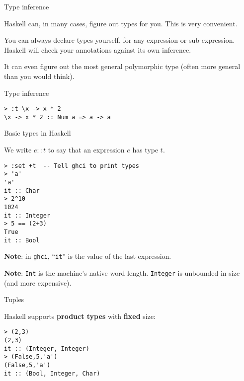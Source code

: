 %
\begin{frame}[fragile]{Type inference}

Haskell can, in many cases, figure out types for you. This is very convenient.

You can always declare types yourself, for any expression or sub-expression.
Haskell will check your annotations against its own inference.

It can even figure out the most general polymorphic type (often more general
than you would think).

\begin{block}{Type inference}
\begin{verbatim}
> :t \x -> x * 2
\x -> x * 2 :: Num a => a -> a
\end{verbatim}
\end{block}

\end{frame}

%
\begin{frame}[fragile]{Basic types in Haskell}

We write $e::t$ to say that an expression $e$ has type $t$.

\begin{block}{}
\begin{verbatim}
> :set +t  -- Tell ghci to print types
> 'a'
'a'
it :: Char
> 2^10
1024
it :: Integer
> 5 == (2+3)
True
it :: Bool
\end{verbatim}
\end{block}

\textbf{Note}: in \texttt{ghci}, ``\texttt{it}'' is the value of the last
expression.

\textbf{Note}: \texttt{Int} is the machine's native word length.
\texttt{Integer} is unbounded in size (and more expensive).

\end{frame}

%
\begin{frame}[fragile]{Tuples}

Haskell supports \textbf{product types} with \textbf{fixed} size:

\begin{block}{}
\begin{verbatim}
> (2,3)
(2,3)
it :: (Integer, Integer)
> (False,5,'a')
(False,5,'a')
it :: (Bool, Integer, Char)
\end{verbatim}
\end{block}

\end{frame}


